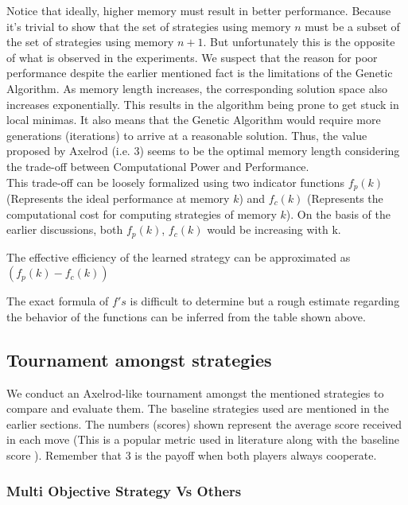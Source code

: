 \documentclass[a4paper]{article}
\begin{document}
	Notice that ideally, higher memory must result in better performance. Because it's trivial to show that the set of strategies using memory $n$ must be a subset of the set of strategies using memory $n+1$. But unfortunately this is the opposite of what is observed in the experiments. We suspect that the reason for poor performance despite the earlier mentioned fact is the limitations of the Genetic Algorithm. As memory length increases, the corresponding solution space also increases exponentially. This results in the algorithm being prone to get stuck in local minimas. It also means that the Genetic Algorithm would require more generations (iterations) to arrive at a reasonable solution. Thus, the value proposed by Axelrod (i.e. 3) seems to be the optimal memory length considering the trade-off between Computational Power and Performance.\\
	
	This trade-off can be loosely formalized using two indicator functions $f_{p}(k)$ (Represents the ideal performance at memory $k$) and $f_{c}(k)$ (Represents the computational cost for computing strategies of memory $k$). On the basis of the earlier discussions, both $f_{p}(k)$, $f_{c}(k)$ would be increasing with k.
	
	\noindent
	The effective efficiency of the learned strategy can be approximated as $(f_{p}(k) - f_{c}(k))$
	 
	 The exact formula of $f's$ is difficult to determine but a rough estimate regarding the behavior of the functions can be inferred from the table shown above. 

	\subsection{Tournament amongst strategies}

	We conduct an Axelrod-like tournament amongst the mentioned strategies to compare and evaluate them. The baseline strategies used are mentioned in the earlier sections. The numbers (scores) shown represent the average score received in each move (This is a popular metric used in literature \cite{optimalipd} along with the baseline score \cite{dawkins}). Remember that 3 is the payoff when both players always cooperate.

	\subsubsection{Multi Objective Strategy Vs Others}
\end{document}
